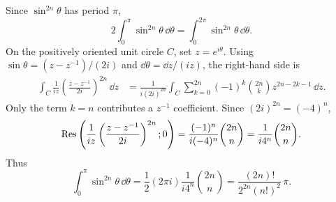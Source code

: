 \documentclass[11pt,oneside]{article}
\begin{document}
\begin{solution}
Since $\sin^{2n}\theta$ has period $\pi$,
\[
    2\int_0^\pi\sin^{2n}\theta\,\dd\theta
       =\int_0^{2\pi}\sin^{2n}\theta\,\dd\theta.
\]
On the positively oriented unit circle $C$, set $z=e^{i\theta}$. Using $\sin\theta=(z-z^{-1})/(2i)$ and $\dd\theta=\dd z/(iz)$, the right-hand side is
\[
\begin{aligned}
    \int_C\frac1{iz}\left(\frac{z-z^{-1}}{2i}\right)^{2n}\,\dd z
    &=\frac1{i(2i)^{2n}}
      \int_C\sum_{k=0}^{2n}(-1)^k\binom{2n}{k}
         z^{2n-2k-1}\,\dd z.
\end{aligned}
\]
Only the term $k=n$ contributes a $z^{-1}$ coefficient. Since $(2i)^{2n}=(-4)^n$,
\[
    \operatorname{Res}\left(\frac1{iz}\left(\frac{z-z^{-1}}{2i}\right)^{2n};0\right)
      =\frac{(-1)^n}{i(-4)^n}\binom{2n}{n}
      =\frac1{i4^n}\binom{2n}{n}.
\]
Thus
\[
    \boxed{\int_0^\pi\sin^{2n}\theta\,\dd\theta
      =\frac12(2\pi i)\frac1{i4^n}\binom{2n}{n}
      =\frac{(2n)!}{2^{2n}(n!)^2}\,\pi.}
\]
\end{solution}
\end{document}
